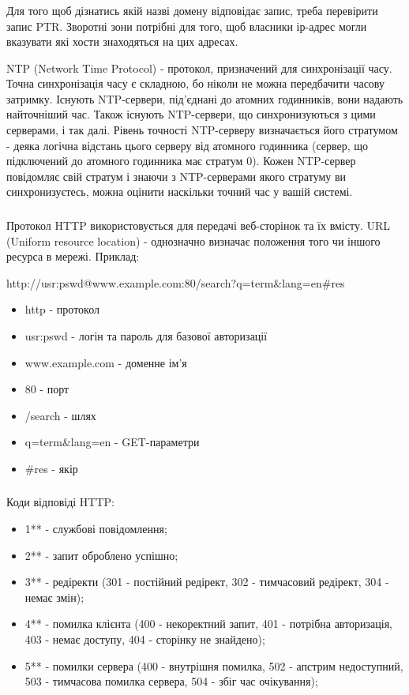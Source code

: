 \documentclass[t]{beamer}  %
\begin{document}
\begin{frame}
 	\frametitle{\insertsection} 
 	\framesubtitle{\insertsubsection}
 Для того щоб дізнатись якій назві домену відповідає запис, треба перевірити запис PTR. Зворотні зони потрібні для того, щоб власники ір-адрес могли вказувати які хости знаходяться на цих адресах.
 
 NTP (Network Time Protocol) - протокол, призначений для синхронізації часу. Точна синхронізація часу є складною, бо ніколи не можна передбачити часову затримку. Існують NTP-сервери, під'єднані до атомних годинників, вони надають найточніший час. Також існують NTP-сервери, що синхронизуються з цими серверами, і так далі. Рівень точності NTP-серверу визначається його стратумом - деяка логічна відстань цього серверу від атомного годинника (сервер, що підключений до атомного годинника має стратум 0).
Кожен NTP-сервер повідомляє свій стратум і знаючи з NTP-серверами якого стратуму ви синхронизуєтесь, можна оцінити наскільки точний час у вашій системі. 
\end{frame}

\begin{frame}
 	\frametitle{\insertsection} 
 	\framesubtitle{\insertsubsection}
Протокол HTTP використовується для передачі веб-сторінок та їх вмісту. URL (Uniform resource location) - однозначно визначає положення того чи іншого ресурса в мережі. Приклад:

http://usr:pswd@www.example.com:80/search?q=term\&lang=en\#res

\begin{itemize}
    \item http - протокол
    \item usr:pswd - логін та пароль для базової авторизації
    \item www.example.com - доменне ім'я
    \item 80 - порт
    \item /search - шлях
    \item q=term\&lang=en - GET-параметри
    \item \#res - якір
  \end{itemize}  
\end{frame}

\begin{frame}
 	\frametitle{\insertsection} 
 	\framesubtitle{\insertsubsection}
Коди відповіді HTTP:
\begin{itemize}
  \item 1** - службові повідомлення;
  \item 2** - запит оброблено успішно;
  \item 3** - редіректи (301 - постійний редірект, 302 - тимчасовий редірект, 304 - немає змін);
  \item 4** - помилка клієнта (400 - некоректний запит, 401 - потрібна авторизація, 403 - немає доступу, 404 - сторінку не знайдено);
  \item 5** - помилки сервера (400 - внутрішня помилка, 502 - апстрим недоступний, 503 - тимчасова помилка сервера, 504 - збіг час очікування);
\end{itemize}
\end{frame}
\end{document}
